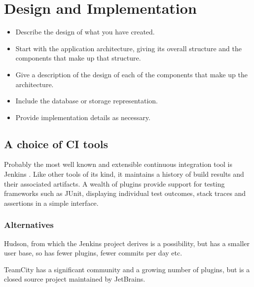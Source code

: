 \section{Design and Implementation}
\label{sec:imp}

\begin{mdframed}
	\begin{itemize}
		\item Describe the design of what you have created.
		\item Start with the application architecture, giving its overall structure and the components that make up that structure.
		\item Give a description of the design of each of the components that make up the architecture.
		\item Include the database or storage representation.
		\item Provide implementation details as necessary.
	\end{itemize}
\end{mdframed}


\subsection{A choice of CI tools}

Probably the most well known and extensible continuous integration tool is Jenkins \cite{Jenkins}. Like other tools of its kind, it maintains a history of build results and their associated artifacts. A wealth of plugins provide support for testing frameworks such as JUnit, displaying individual test outcomes, stack traces and assertions in a simple interface.

\subsubsection{Alternatives}

Hudson, from which the Jenkins project derives is a possibility, but has a smaller user base, so has fewer plugins, fewer commits per day etc.

TeamCity \cite{TeamCity} has a significant community and a growing number of plugins, but is a closed source project maintained by JetBrains.

